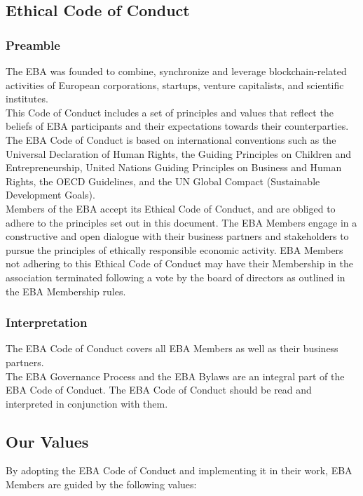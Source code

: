 \documentclass{article}
\begin{document}
\subsection{Ethical Code of Conduct}

\subsubsection{Preamble}

The EBA was founded to combine, synchronize and leverage blockchain-related activities of European corporations, startups, venture capitalists, and scientific institutes. \\
This Code of Conduct includes a set of principles and values that reflect the beliefs of EBA participants and their expectations towards their counterparties. \\
The EBA Code of Conduct is based on international conventions such as the Universal Declaration of Human Rights, the Guiding Principles on Children and Entrepreneurship, United Nations Guiding Principles on Business and Human Rights, the OECD Guidelines, and the UN Global Compact (Sustainable Development Goals). \\
Members of the EBA accept its Ethical Code of Conduct, and are obliged to adhere to the principles set out in this document. 
The EBA Members engage in a constructive and open dialogue with their business partners and stakeholders to pursue the principles of ethically responsible economic activity.
EBA Members not adhering to this Ethical Code of Conduct may have their Membership in the association terminated following a vote by the board of directors as outlined in the EBA Membership rules.

\subsubsection{Interpretation}

The EBA Code of Conduct covers all EBA Members as well as their business partners. \\
The EBA Governance Process and the EBA Bylaws are an integral part of the EBA Code of Conduct. The EBA Code of Conduct should be read and interpreted in conjunction with them.

\subsection{Our Values}

By adopting the EBA Code of Conduct and implementing it in their work, EBA Members are guided by the following values: \\
\end{document}
